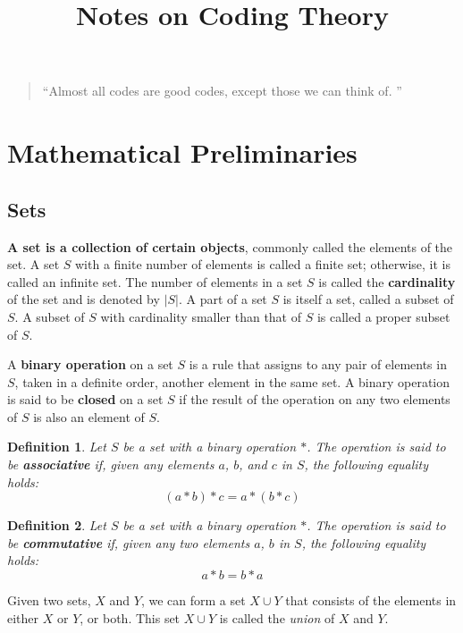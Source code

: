 \documentclass[11pt]{article}
\newtheorem{definition}{Definition}
\begin{document}
\title{Notes on Coding Theory}
\author{}
\date{}
\maketitle

\begin{quote}
{\Large
  ``Almost all codes are good codes, except those we can think of. ''
}
\end{quote}

\tableofcontents
\newpage

\clearpage
\section{Mathematical Preliminaries}
\subsection{Sets}

\textbf{A set is a collection of certain objects}, commonly called the elements of the set.
A set $S$ with a finite number of elements is called a finite set; otherwise, it is called an infinite set.
The number of elements in a set $S$ is called the \textbf{cardinality} of the set and is denoted by $|S|$.
A part of a set $S$ is itself a set, called a subset of $S$. A subset of $S$ with cardinality smaller than that of $S$ is called a proper subset of $S$.

A \textbf{binary operation} on a set $S$ is a rule that assigns to any pair of elements in $S$, taken in a definite order, another element in the same set. 
A binary operation is said to be \textbf{closed} on a set $S$ if the result of the operation on any two elements of $S$ is also an element of $S$.

\begin{definition}
  Let $S$ be a set with a binary operation $\ast$. The operation is said to be \textbf{associative} if, given any elements $a$, $b$, and $c$ in $S$, the following equality holds:
  \[
    (a \ast b) \ast c = a \ast (b \ast c)
  \]
\end{definition}

\begin{definition}
  Let $S$ be a set with a binary operation $\ast$. The operation is said to be \textbf{commutative} if, given any two elements $a$, $b$ in $S$, the following equality holds:
  \[
    a \ast b = b \ast a
  \]
\end{definition}

Given two sets, $X$ and $Y$, we can form a set $X \cup Y$ that consists of the elements in either $X$ or $Y$, or both. This set $X \cup Y$ is called the \textit{union} of $X$ and $Y$. 
\end{document}
